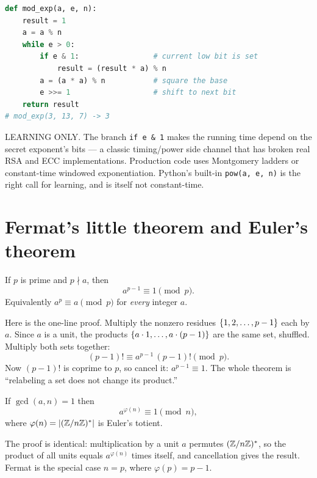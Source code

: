\begin{implementbox}
\begin{lstlisting}[language=Python]
def mod_exp(a, e, n):
    result = 1
    a = a % n
    while e > 0:
        if e & 1:                 # current low bit is set
            result = (result * a) % n
        a = (a * a) % n           # square the base
        e >>= 1                   # shift to next bit
    return result
# mod_exp(3, 13, 7) -> 3
\end{lstlisting}
LEARNING ONLY. The branch \texttt{if e \& 1} makes the running time depend on the secret exponent's
bits --- a classic timing/power side channel that has broken real RSA and ECC implementations.
Production code uses Montgomery ladders or constant-time windowed exponentiation. Python's built-in
\texttt{pow(a, e, n)} is the right call for learning, and is itself not constant-time.
\end{implementbox}

\section{Fermat's little theorem and Euler's theorem}
\label{ch40:fermateuler}

\begin{theorem}
\label{ch40:thm-fermat}
If $p$ is prime and $p \nmid a$, then
\[
  a^{p-1} \equiv 1 \pmod p.
\]
Equivalently $a^p \equiv a \pmod p$ for \emph{every} integer $a$.
\end{theorem}

\begin{whybox}
Here is the one-line proof. Multiply the nonzero residues
$\{1,2,\dots,p-1\}$ each by $a$. Since $a$ is a unit, the products $\{a\cdot 1,\dots,a\cdot
(p-1)\}$ are the same set, shuffled. Multiply both sets together:
\[
  (p-1)! \equiv a^{p-1}\,(p-1)! \pmod p.
\]
Now $(p-1)!$ is coprime to $p$, so cancel it: $a^{p-1}\equiv 1$. The whole theorem is ``relabeling
a set does not change its product.''
\end{whybox}

\begin{theorem}
\label{ch40:thm-euler}
If $\gcd(a,n)=1$ then
\[
  a^{\varphi(n)} \equiv 1 \pmod n,
\]
where $\varphi(n) = \lvert(\mathbb{Z}/n\mathbb{Z})^{*}\rvert$ is Euler's totient.
\end{theorem}

The proof is identical: multiplication by a unit $a$ permutes $(\mathbb{Z}/n\mathbb{Z})^{*}$, so the product of all units
equals $a^{\varphi(n)}$ times itself, and cancellation gives the result. Fermat is the special case
$n=p$, where $\varphi(p)=p-1$.

